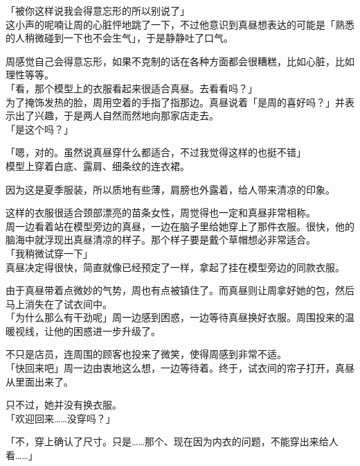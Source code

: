 「被你这样说我会得意忘形的所以别说了」\\

这小声的呢喃让周的心脏怦地跳了一下，不过他意识到真昼想表达的可能是「熟悉的人稍微碰到一下也不会生气」，于是静静吐了口气。

周感觉自己会得意忘形，如果不克制的话在各种方面都会很糟糕，比如心脏，比如理性等等。\\

「看，那个模型上的衣服看起来很适合真昼。去看看吗？」\\

为了掩饰发热的脸，周用空着的手指了指那边。真昼说着「是周的喜好吗？」并表示出了兴趣，于是两人自然而然地向那家店走去。\\

「是这个吗？」

「嗯，对的。虽然说真昼穿什么都适合，不过我觉得这样的也挺不错」\\

模型上穿着白底、露肩、细条纹的连衣裙。

因为这是夏季服装，所以质地有些薄，肩膀也外露着，给人带来清凉的印象。

这样的衣服很适合颈部漂亮的苗条女性，周觉得也一定和真昼非常相称。\\

周一边看着站在模型旁边的真昼，一边在脑子里给她穿上了那件衣服。很快，他的脑海中就浮现出真昼清凉的样子。那个样子要是戴个草帽想必非常适合。\\

「我稍微试穿一下」\\

真昼决定得很快，简直就像已经预定了一样，拿起了挂在模型旁边的同款衣服。

由于真昼带着点微妙的气势，周也有点被镇住了。而真昼则让周拿好她的包，然后马上消失在了试衣间中。\\%

「为什么那么有干劲呢」周一边感到困惑，一边等待真昼换好衣服。周围投来的温暖视线，让他的困惑进一步升级了。

不只是店员，连周围的顾客也投来了微笑，使得周感到非常不适。\\

「快回来吧」周一边由衷地这么想，一边等待着。终于，试衣间的帘子打开，真昼从里面出来了。

只不过，她并没有换衣服。\\

「欢迎回来……没穿吗？」

「不，穿上确认了尺寸。只是……那个、现在因为内衣的问题，不能穿出来给人看……」

